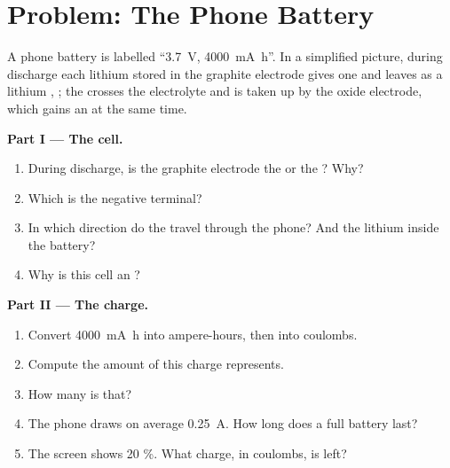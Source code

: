 \section{Problem: The Phone Battery}

\begin{problem}
\label{pb:g12:cells-and-electrolysis:1}
A phone battery is labelled ``\qty{3.7}{V}, \qty{4000}{mA.h}''. In a
simplified picture, during discharge each lithium  stored in the
graphite electrode gives one  and leaves as a lithium ,
; the  crosses the electrolyte and is taken up by
the  oxide electrode, which gains an  at the same time.

\medskip
\noindent\textbf{Part I --- The cell.}
\begin{enumerate}
  \item During discharge, is the graphite electrode the  or the
        ? Why?
  \item Which is the negative terminal?
  \item In which direction do the  travel through the phone?
        And the lithium  inside the battery?
  \item Why is this cell an ?
\end{enumerate}

\medskip
\noindent\textbf{Part II --- The charge.}
\begin{enumerate}[resume]
  \item Convert \qty{4000}{mA.h} into ampere-hours, then into coulombs.
  \item Compute the amount of  this charge represents.
  \item How many  is that?
  \item The phone draws on average \qty{0.25}{A}. How long does a full
        battery last?
  \item The screen shows 20 \%. What charge, in coulombs, is left?
\end{enumerate}


\end{problem}
